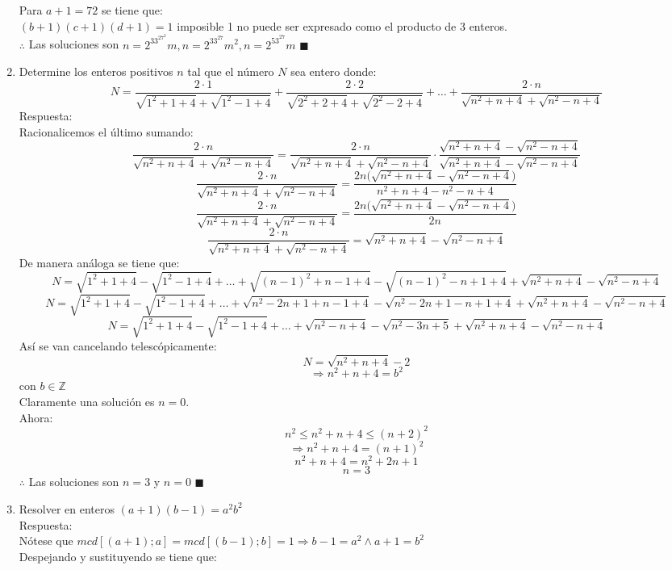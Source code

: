 \documentclass{book}
\newcommand{\Z}{\mathbb{Z}} \def\max{\mathop{\mbox{\rm máx}}} %
\begin{document}
\begin{enumerate}
        Para $a + 1 = 72$ se tiene que: \\
        $(b + 1)(c + 1)(d + 1) = 1$ imposible 1 no puede ser expresado como el producto de 3 enteros. \\
        $\therefore$ Las soluciones son $n= 2^33^27^2m , n= 2^33^27m^2, n= 2^53^27m$ $\blacksquare$\\
        \item Determine los enteros positivos $n$ tal que el número $N$ sea entero donde:
        $$N=\frac{2\cdot1}{\sqrt{1^2+1+4}+\sqrt{1^2-1+4}}+\frac{2\cdot2}{\sqrt{2^2+2+4}+\sqrt{2^2-2+4}}+ \ldots+                                \frac{2\cdot n}{\sqrt{n^2+n+4}+\sqrt{n^2-n+4}}$$
        Respuesta:\\
        Racionalicemos el último sumando:
        $$\frac{2\cdot n}{\sqrt{n^2+n+4}+\sqrt{n^2-n+4}}=\frac{2\cdot n}{\sqrt{n^2+n+4}+\sqrt{n^2-n+4}}\cdot\frac{\sqrt{n^2+n+4}-\sqrt{n^2-n+4}}{\sqrt{n^2+n+4}-\sqrt{n^2-n+4}}$$
        $$\frac{2\cdot n}{\sqrt{n^2+n+4}+\sqrt{n^2-n+4}}=\frac{2n\big(\sqrt{n^2+n+4}-\sqrt{n^2-n+4}\big)}{n^2+n+4-n^2-n+4}$$
        $$\frac{2\cdot n}{\sqrt{n^2+n+4}+\sqrt{n^2-n+4}}=\frac{2n\big(\sqrt{n^2+n+4}-\sqrt{n^2-n+4}\big)}{2n}$$
        $$\frac{2\cdot n}{\sqrt{n^2+n+4}+\sqrt{n^2-n+4}}=\sqrt{n^2+n+4}-\sqrt{n^2-n+4}$$
        De manera análoga se tiene que:
        $$N=\sqrt{1^2+1+4}-\sqrt{1^2-1+4}+\ldots+\sqrt{{(n-1)}^2+n-1+4}-        \sqrt{{(n-1)}^2-n+1+4}+\sqrt{n^2+n+4}-\sqrt{n^2-n+4}$$
        $$N=\sqrt{1^2+1+4}-\sqrt{1^2-1+4}+\ldots+\sqrt{n^2-2n+1+n-1+4}-\sqrt{n^2-2n+1-n+1+4}+\sqrt{n^2+n+4}-\sqrt{n^2-n+4}$$
        $$N=\sqrt{1^2+1+4}-\sqrt{1^2-1+4}+\ldots+\sqrt{n^2-n+4}-\sqrt{n^2-3n+5}+\sqrt{n^2+n+4}-\sqrt{n^2-n+4}$$
        Así se van cancelando telescópicamente:
        $$N= \sqrt{n^2+n+4} - 2$$
        $$\Rightarrow n^2 + n + 4 = b^2$$
        con $b \in \Z$ \\
        Claramente una solución es $n = 0$. \\Ahora:
        $$n^2\leq n^2 + n + 4 \leq {(n+2)}^2$$
        $$\Rightarrow  n^2 + n + 4 ={(n+1)}^2$$
        $$n^2 + n + 4=n^2+2n+1$$
        $$n=3$$
        $\therefore$ Las soluciones son $n = 3$ y $n = 0$ $\blacksquare$\\
        \item  Resolver en enteros $(a+1)(b-1)=a^2b^2$\\
        Respuesta:\\
        Nótese que $mcd[(a + 1);a] = mcd[(b - 1);b] = 1 \Rightarrow b - 1 = a^2 \wedge a + 1 = b^2$\\
        Despejando y sustituyendo se tiene que:

\end{enumerate}
\end{document}
